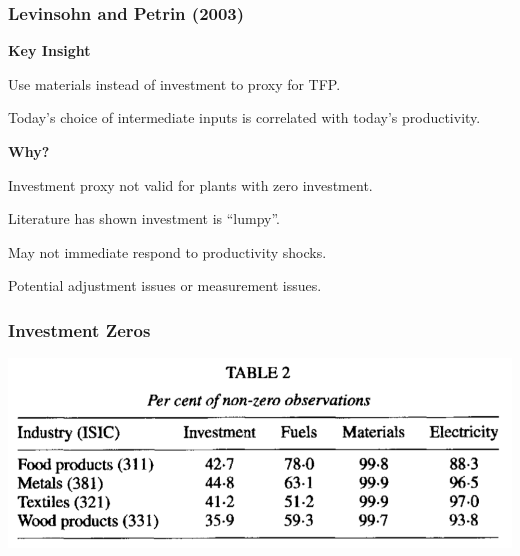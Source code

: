 \documentclass[11pt, aspectratio=169]{beamer}
\newenvironment{wideitemize}{\itemize\addtolength{\itemsep}{10pt}}{\enditemize}
\begin{document}
\begin{frame}[c]\frametitle{Levinsohn and Petrin (2003)}
    
    \textbf{Key Insight}

    \begin{wideitemize}
    	\item Use materials instead of investment to proxy for TFP.
    	\item Today's choice of intermediate inputs is correlated with today's productivity.
    \end{wideitemize}
    
    \bigskip
    \textbf{Why?}
    \begin{wideitemize}
    	\item Investment proxy not valid for plants with zero investment.
    	\item Literature has shown investment is ``lumpy''.
    	\begin{wideitemize}
    		\item May not immediate respond to productivity shocks.
    		\item Potential adjustment issues or measurement issues.
    	\end{wideitemize}
    	
    \end{wideitemize}
    
\end{frame}



\begin{frame}[c]\frametitle{Investment Zeros}

\centering    
\includegraphics[height=.5\textheight]{LP-Table2.png}

\end{frame}
\end{document}
